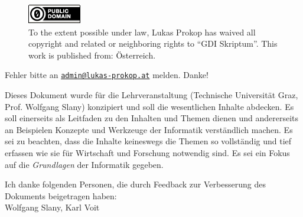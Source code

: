 \begin{titlepage}
  \begin{center}
    \begin{figure}[ht!]
      \begin{center}
        \includegraphics[width=88px,height=33px]{img/cc0.png} \\[20pt]%
        To the extent possible under law, Lukas Prokop has waived all copyright and related
        or neighboring rights to ``GDI Skriptum''. This work is published from: Österreich. 
      \end{center}
    \end{figure}
    \vspace{50pt}
    \noindent Fehler bitte an
    \href{mailto:admin@lukas-prokop.at}{\nolinkurl{admin@lukas-prokop.at}}
    melden. Danke!
    \vspace{50pt}

    Dieses Dokument wurde für die Lehrveranstaltung \courselfocs{}
    (Technische Universität Graz, Prof. Wolfgang Slany) konzipiert
    und soll die wesentlichen Inhalte abdecken. Es soll einerseits als
    Leitfaden zu den Inhalten und Themen dienen und andererseits an Beispielen
    Konzepte und Werkzeuge der Informatik verständlich machen. Es sei zu beachten,
    dass die Inhalte keineswegs die Themen so vollständig und tief erfassen
    wie sie für Wirtschaft und Forschung notwendig sind. Es sei ein Fokus
    auf die \emph{Grundlagen} der Informatik gegeben.

    \vspace{50pt}
    Ich danke folgenden Personen, die durch Feedback zur Verbesserung
    des Dokuments beigetragen haben: \\[15pt]
    Wolfgang Slany, Karl Voit
  \end{center}
\end{titlepage}

